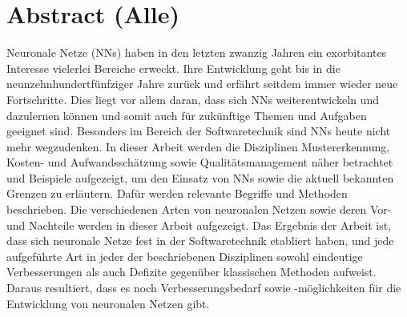 \section*{Abstract (Alle)}
Neuronale Netze (NNs) haben in den letzten zwanzig Jahren ein exorbitantes Interesse vielerlei Bereiche erweckt. Ihre Entwicklung geht bis in die neunzehnhundertfünfziger Jahre zurück und erfährt seitdem immer wieder neue Fortschritte. Dies liegt vor allem daran, dass sich NNs weiterentwickeln und dazulernen können und somit auch für zukünftige Themen und Aufgaben geeignet sind. Besonders im Bereich der Softwaretechnik sind NNs heute nicht mehr wegzudenken. In dieser Arbeit werden die Disziplinen Mustererkennung, Kosten- und Aufwandsschätzung sowie Qualitätsmanagement näher betrachtet und Beispiele aufgezeigt, um den Einsatz von NNs sowie die aktuell bekannten Grenzen zu erläutern. Dafür werden relevante Begriffe und Methoden beschrieben. Die verschiedenen Arten von neuronalen Netzen sowie deren Vor- und Nachteile werden in dieser Arbeit aufgezeigt. Das Ergebnis der Arbeit ist, dass sich neuronale Netze fest in der Softwaretechnik etabliert haben, und jede aufgeführte Art in jeder der beschriebenen Disziplinen sowohl eindeutige Verbesserungen als auch Defizite gegenüber klassischen Methoden aufweist. Daraus resultiert, dass es noch Verbesserungsbedarf sowie -möglichkeiten für die Entwicklung von neuronalen Netzen gibt.